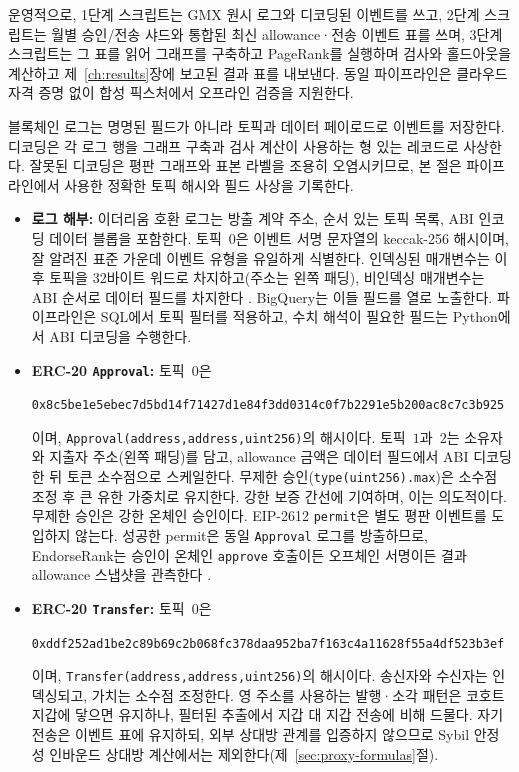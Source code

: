 운영적으로, 1단계 스크립트는 GMX 원시 로그와 디코딩된 이벤트를 쓰고, 2단계 스크립트는 월별 승인/전송 샤드와 통합된 최신 allowance·전송 이벤트 표를 쓰며, 3단계 스크립트는 그 표를 읽어 그래프를 구축하고 PageRank를 실행하며 검사와 홀드아웃을 계산하고 제~\ref{ch:results}장에 보고된 결과 표를 내보낸다. 동일 파이프라인은 클라우드 자격 증명 없이 합성 픽스처에서 오프라인 검증을 지원한다.


블록체인 로그는 명명된 필드가 아니라 토픽과 데이터 페이로드로 이벤트를 저장한다. 디코딩은 각 로그 행을 그래프 구축과 검사 계산이 사용하는 형 있는 레코드로 사상한다. 잘못된 디코딩은 평판 그래프와 표본 라벨을 조용히 오염시키므로, 본 절은 파이프라인에서 사용한 정확한 토픽 해시와 필드 사상을 기록한다.

\begin{itemize}
\item \textbf{로그 해부:} 이더리움 호환 로그는 방출 계약 주소, 순서 있는 토픽 목록, ABI 인코딩 데이터 블롭을 포함한다. 토픽~$0$은 이벤트 서명 문자열의 keccak-256 해시이며, 잘 알려진 표준 가운데 이벤트 유형을 유일하게 식별한다. 인덱싱된 매개변수는 이후 토픽을 $32$바이트 워드로 차지하고(주소는 왼쪽 패딩), 비인덱싱 매개변수는 ABI 순서로 데이터 필드를 차지한다 . BigQuery는 이들 필드를 열로 노출한다. 파이프라인은 SQL에서 토픽 필터를 적용하고, 수치 해석이 필요한 필드는 Python에서 ABI 디코딩을 수행한다.

\item \textbf{ERC-20 \texttt{Approval}:} 토픽~$0$은
\begin{center}
\texttt{0x8c5be1e5ebec7d5bd14f71427d1e84f3dd0314c0f7b2291e5b200ac8c7c3b925}
\end{center}
이며, \texttt{Approval(address,address,uint256)}의 해시이다. 토픽~$1$과~$2$는 소유자와 지출자 주소(왼쪽 패딩)를 담고, allowance 금액은 데이터 필드에서 ABI 디코딩한 뒤 토큰 소수점으로 스케일한다. 무제한 승인(\texttt{type(uint256).max})은 소수점 조정 후 큰 유한 가중치로 유지한다. 강한 보증 간선에 기여하며, 이는 의도적이다. 무제한 승인은 강한 온체인 승인이다. EIP-2612 \texttt{permit}은 별도 평판 이벤트를 도입하지 않는다. 성공한 permit은 동일 \texttt{Approval} 로그를 방출하므로, EndorseRank는 승인이 온체인 \texttt{approve} 호출이든 오프체인 서명이든 결과 allowance 스냅샷을 관측한다 .

\item \textbf{ERC-20 \texttt{Transfer}:} 토픽~$0$은
\begin{center}
\texttt{0xddf252ad1be2c89b69c2b068fc378daa952ba7f163c4a11628f55a4df523b3ef}
\end{center}
이며, \texttt{Transfer(address,address,uint256)}의 해시이다. 송신자와 수신자는 인덱싱되고, 가치는 소수점 조정한다. 영 주소를 사용하는 발행·소각 패턴은 코호트 지갑에 닿으면 유지하나, 필터된 추출에서 지갑 대 지갑 전송에 비해 드물다. 자기 전송은 이벤트 표에 유지하되, 외부 상대방 관계를 입증하지 않으므로 Sybil 안정성 인바운드 상대방 계산에서는 제외한다(제~\ref{sec:proxy-formulas}절).


\end{itemize}
